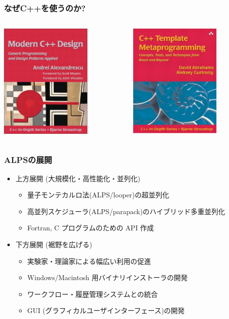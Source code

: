 \begin{frame}
  \frametitle{なぜC++を使うのか?}
  \begin{columns}[T]
    \begin{column}{.5\textwidth}
      \centering \includegraphics[width=4.5cm]{modern-cxx.pdf}
    \end{column}
    \begin{column}{.5\textwidth}
      \centering \includegraphics[width=4.5cm]{cxx-template.pdf}
    \end{column}
  \end{columns}
\end{frame}

\begin{frame}
  \frametitle{ALPSの展開}
  \begin{itemize}
    \setlength{\itemsep}{1em}
  \item 上方展開 (大規模化・高性能化・並列化)
    \begin{itemize}
    \item 量子モンテカルロ法(ALPS/looper)の超並列化
    \item 高並列スケジューラ(ALPS/parapack)のハイブリッド多重並列化
    \item Fortran, C プログラムのための API 作成
    \end{itemize}
  \item 下方展開 (裾野を広げる)
    \begin{itemize}
    \item 実験家・理論家による幅広い利用の促進
    \item Windows/Macintosh 用バイナリインストーラの開発
    \item ワークフロー・履歴管理システムとの統合
    \item GUI (グラフィカルユーザインターフェース)の開発
    \end{itemize}
  \end{itemize}
\end{frame}

